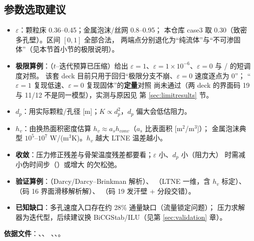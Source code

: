 \subsection{参数选取建议}
\begin{itemize}
  \item \textbf{$\varepsilon$}：颗粒床 0.36--0.45；金属泡沫/丝网 0.8--0.95；
        本仓库 case3 取 0.30（致密多孔壁）。区间 $[0,1]$ 全部合法，
        两端点分别退化为“纯流体”与“不可渗固体”（见本节首小节的极限说明）。
  \item \textbf{极限算例}：（$t$--迭代预算已压缩）给出
        $\varepsilon=1$、$\varepsilon=1\times10^{-6}$、$\varepsilon=0$ 与
        / 的短调度对照。
        该套 deck 目前只用于回归“极限分支不崩、$\varepsilon=0$ 速度逐点为 0”；
        “$\varepsilon=1$ 复现低速、$\varepsilon=0$ 复现固体”的\textbf{定量}对照
        尚未通过（两 deck 的界面码 19 与 11/12 不是同一模型），实测与原因见
        第 \ref{sec:limitresults} 节。
  \item \textbf{$d_p$}：用实际颗粒/孔径 [m]；$K\propto d_p^2$，$d_p$ 偏大会低估阻力。
  \item \textbf{$h_v$}：由换热面积密度估算 $h_v\approx a_s h_{conv}$（$a_s$ 比表面积 [m$^2$/m$^3$]）；
        金属泡沫典型 $10^{5}$--$10^{7}$ W/(m$^3$K)。$h_v$ 越大 LTNE 温差越小。
  \item \textbf{收敛}：压力修正残差与骨架温度残差都要看；$\varepsilon$ 小、$d_p$ 小（阻力大）
        时需减小伪时间步（）或增大  的欠松弛。
  \item \textbf{验证算例}：（Darcy/Darcy--Brinkman 解析）、
        （LTNE 一维，含 $h_v$ 标定）、
        （码 16 界面滑移解析解）、
        （码 19 发汗壁 + 分段交错）。
  \item \textbf{已知缺口}：多孔速度入口存在约 28\% 通量缺口（流量锁定问题）；
        压力求解器为迭代型，后续建议换 BiCGStab/ILU（见第 \ref{sec:validation} 章）。
\end{itemize}

\noindent\textbf{依据文件}：、、
、、。
